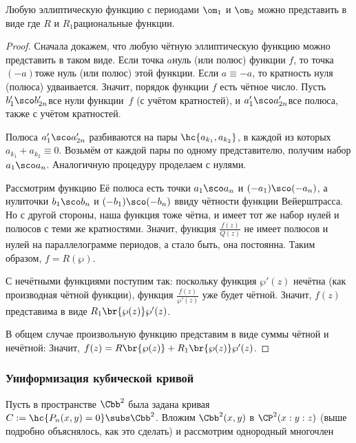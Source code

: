 \documentclass[a4paper]{article}
\begin{document}
\begin{theorem}
Любую эллиптическую функцию с периодами $\om_1$ и $\om_2$ можно представить в виде
где $R$ и $R_1$\т рациональные функции.
\end{theorem}
\begin{proof}
Сначала докажем, что любую чётную эллиптическую функцию можно представить в таком виде.
Если точка $a$\т нуль (или полюс) функции $f$, то точка $(-a)$\Т тоже нуль (или полюс)
этой функции. Если $a \equiv -a$, то кратность нуля (полюса) удваивается. Значит,
порядок функции $f$ есть чётное число. Пусть $b'_1\sco b'_{2n}$\т все нули функции~$f$
(с учётом кратностей), и $a'_1\sco a'_{2n}$\т все полюса, также с учётом кратностей.

Полюса $a'_1\sco a'_{2n}$ разбиваются на пары $\hc{a_{k_1},a_{k_2}}$, в каждой
из которых $a_{k_1} + a_{k_2}\equiv 0$. Возьмём от каждой пары по одному представителю,
получим набор $a_1\sco a_n$. Аналогичную процедуру проделаем с нулями.

Рассмотрим функцию
Её полюса есть точки $a_1\sco a_n$ и $(-a_1)\sco (-a_n)$, а нули\т точки
$b_1\sco b_n$ и $(-b_1)\sco (-b_n)$ ввиду чётности функции Вейерштрасса. Но с другой
стороны, наша функция тоже чётна, и имеет тот же набор нулей и полюсов с теми же
кратностями. Значит, функция $\frac{f(z)}{Q(z)}$ не имеет полюсов и нулей на параллелограмме
периодов, а стало быть, она постоянна. Таким образом, $f = R(\wp)$.

С нечётными функциями поступим так: поскольку функция $\wp'(z)$ нечётна (как
производная чётной функции), функция $\frac{f(z)}{\wp'(z)}$ уже будет чётной.
Значит, $f(z)$ представима в виде $R_1\br{\wp(z)}\wp'(z)$.

В общем случае произвольную функцию представим в виде суммы чётной и нечётной:
Значит, $f(z) = R\br{\wp(z)}+R_1\br{\wp(z)}\wp'(z)$.
\end{proof}

\subsubsection{Униформизация кубической кривой}

Пусть в пространстве $\Cbb^2$ была задана кривая $C := \hc{P_n(x,y)=0}\subs\Cbb^2$.
Вложим $\Cbb^2(x,y)$ в $\CP^2(x:y:z)$ (выше подробно объяснялось, как это
сделать) и рассмотрим однородный многочлен
\end{document}
